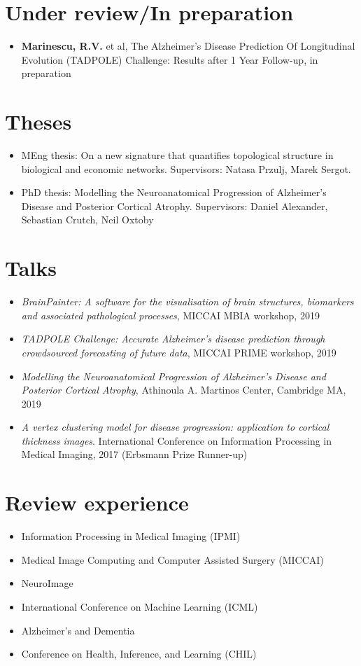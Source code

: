 \documentclass[a4paper,10pt]{article} %
\begin{document}
\section*{Under review/In preparation}
\begin{itemize}
 \item \textbf{Marinescu, R.V.} et al, The Alzheimer's Disease Prediction Of Longitudinal Evolution (TADPOLE) Challenge: Results after 1 Year Follow-up, in preparation
\end{itemize}


\section*{Theses}
\begin{itemize}
 \item MEng thesis: On a new signature that quantifies topological structure in biological and economic networks. Supervisors: Natasa Przulj, Marek Sergot.
 \item PhD thesis: Modelling the Neuroanatomical Progression of Alzheimer's Disease and Posterior Cortical Atrophy. Supervisors: Daniel Alexander, Sebastian Crutch, Neil Oxtoby
\end{itemize}

\section*{Talks}
\begin{itemize}
 \item \emph{BrainPainter: A software for the visualisation of brain structures, biomarkers and associated pathological processes}, MICCAI MBIA workshop, 2019
 \item \emph{TADPOLE Challenge: Accurate Alzheimer's disease prediction through crowdsourced forecasting of future data}, MICCAI PRIME workshop, 2019
 \item \emph{Modelling the Neuroanatomical Progression of Alzheimer's Disease and Posterior Cortical Atrophy}, Athinoula A. Martinos Center, Cambridge MA, 2019
 \item \emph{A vertex clustering model for disease progression: application to cortical thickness images}. International Conference on Information Processing in Medical Imaging, 2017 (Erbsmann Prize Runner-up)
\end{itemize}

\section*{Review experience}
\begin{itemize}
 \item Information Processing in Medical Imaging (IPMI)
 \item Medical Image Computing and Computer Assisted Surgery (MICCAI)
 \item NeuroImage
 \item International Conference on Machine Learning (ICML)
 \item Alzheimer's and Dementia
 \item Conference on Health, Inference, and Learning (CHIL)
\end{itemize}
\end{document}
